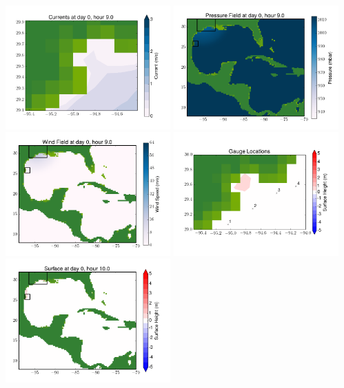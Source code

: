 \documentclass[11pt]{article}
\begin{document}
\vskip 10pt 
\includegraphics[width=0.475\textwidth]{frame0081fig7.png}
\includegraphics[width=0.475\textwidth]{frame0081fig8.png}
\vskip 10pt 
\includegraphics[width=0.475\textwidth]{frame0081fig9.png}
\includegraphics[width=0.475\textwidth]{frame0081fig10.png}
\vskip 10pt 
\includegraphics[width=0.475\textwidth]{frame0082fig1.png}
\end{document}
